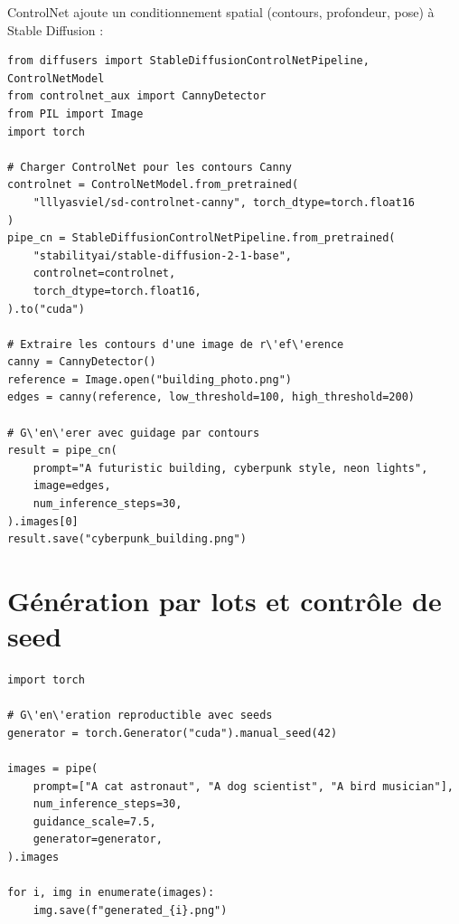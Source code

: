 ControlNet ajoute un conditionnement spatial (contours, profondeur, pose) \`a Stable Diffusion :

\begin{verbatim}
from diffusers import StableDiffusionControlNetPipeline, ControlNetModel
from controlnet_aux import CannyDetector
from PIL import Image
import torch

# Charger ControlNet pour les contours Canny
controlnet = ControlNetModel.from_pretrained(
    "lllyasviel/sd-controlnet-canny", torch_dtype=torch.float16
)
pipe_cn = StableDiffusionControlNetPipeline.from_pretrained(
    "stabilityai/stable-diffusion-2-1-base",
    controlnet=controlnet,
    torch_dtype=torch.float16,
).to("cuda")

# Extraire les contours d'une image de r\'ef\'erence
canny = CannyDetector()
reference = Image.open("building_photo.png")
edges = canny(reference, low_threshold=100, high_threshold=200)

# G\'en\'erer avec guidage par contours
result = pipe_cn(
    prompt="A futuristic building, cyberpunk style, neon lights",
    image=edges,
    num_inference_steps=30,
).images[0]
result.save("cyberpunk_building.png")
\end{verbatim}

\section{G\'en\'eration par lots et contr\^ole de seed}

\begin{verbatim}
import torch

# G\'en\'eration reproductible avec seeds
generator = torch.Generator("cuda").manual_seed(42)

images = pipe(
    prompt=["A cat astronaut", "A dog scientist", "A bird musician"],
    num_inference_steps=30,
    guidance_scale=7.5,
    generator=generator,
).images

for i, img in enumerate(images):
    img.save(f"generated_{i}.png")
\end{verbatim}

